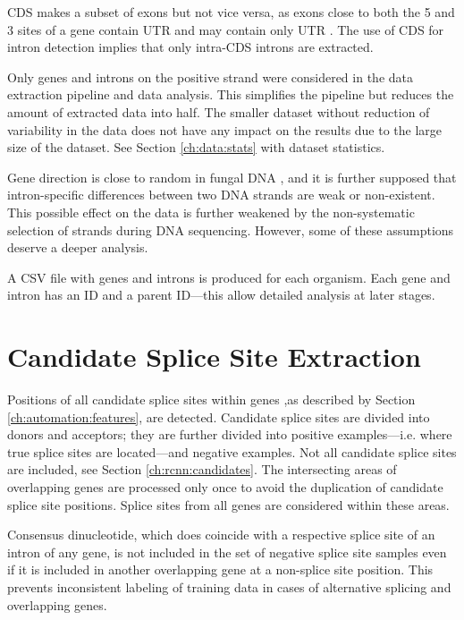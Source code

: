 CDS makes a subset of exons but not vice versa, as exons close to both the
5\textquotesingle{} and 3\textquotesingle{} sites of a gene contain UTR and may
contain only UTR \cite{bicknell2012introns}. The use of CDS for intron
detection implies that only intra-CDS introns are extracted.

Only genes and introns on the positive strand were considered in the data
extraction pipeline and data analysis. This simplifies the pipeline but reduces
the amount of extracted data into half. The smaller dataset without reduction
of variability in the data does not have any impact on the results due to the
large size of the dataset. See Section \ref{ch:data:stats} with dataset
statistics.

Gene direction is close to random in fungal DNA \cite{li2012gene}, and it is
further supposed that intron-specific differences between two DNA strands are
weak or non-existent. This possible effect on the data is further weakened by
the non-systematic selection of strands during DNA sequencing. However, some of
these assumptions deserve a deeper analysis.

A CSV file with genes and introns is produced for each organism. Each gene and
intron has an ID and a parent ID---this allow detailed analysis at later
stages.

\section{\label{ch:automation:positions}Candidate Splice Site Extraction}

Positions of all candidate splice sites within genes ,as described by Section
\ref{ch:automation:features}, are detected. Candidate splice sites are divided
into donors and acceptors; they are further divided into positive
examples---i.e. where true splice sites are located---and negative examples.
Not all candidate splice sites are included, see Section
\ref{ch:rcnn:candidates}. The intersecting areas of overlapping genes are
processed only once to avoid the duplication of candidate splice site
positions. Splice sites from all genes are considered within these areas.

Consensus dinucleotide, which does coincide with a respective splice site of an
intron of any gene, is not included in the set of negative splice site samples
even if it is included in another overlapping gene at a non-splice site
position. This prevents inconsistent labeling of training data in cases of
alternative splicing and overlapping genes.

